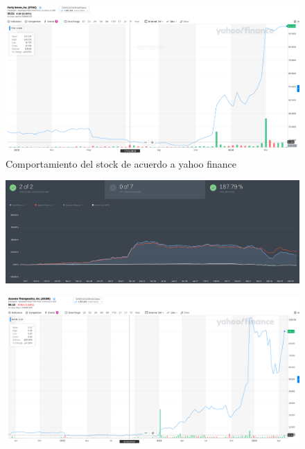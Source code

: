 \documentclass[12pt,a4paper]{article}
\begin{document}
\begin{figure}
	\centering
	\includegraphics[width=1\linewidth]{yahoo_6_meses}
	\caption{Comportamiento del stock de acuerdo a yahoo finance}
	\label{fig:yahoo6meses}
\end{figure}
\begin{figure}
	\centering
	\includegraphics[width=1\linewidth]{inversion_2_anos}
	\caption{}
	\label{fig:inversion2anos}
\end{figure}
\begin{figure}
	\centering
	\includegraphics[width=1\linewidth]{yahoo_2_anos}
	\caption{}
	\label{fig:yahoo2anos}
\end{figure}
\end{document}

